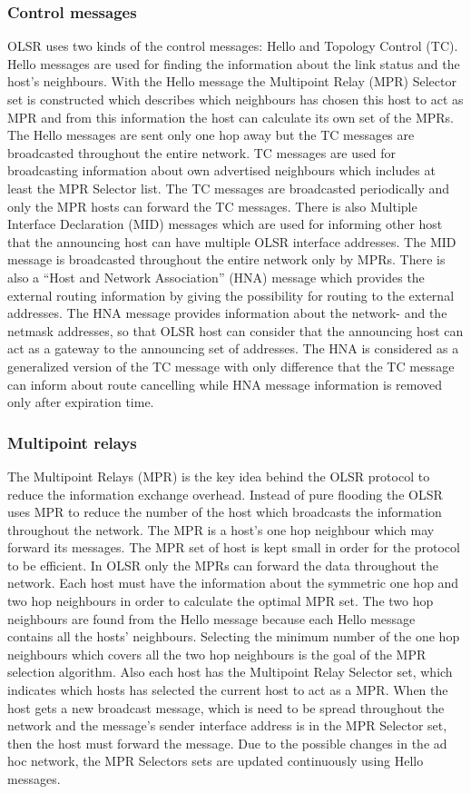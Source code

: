 \documentclass[a4paper]{article}
\begin{document}
\subsubsection{Control messages}
OLSR uses two kinds of the control messages: Hello and Topology Control (TC). Hello messages are used for finding the information about the link status and the host’s neighbours. With the Hello message the Multipoint Relay (MPR) Selector set is constructed which describes which neighbours has chosen this host to act as MPR and from this information the host can calculate its own set of the MPRs. The Hello messages are sent only one hop away but the TC messages are broadcasted throughout the entire network. TC messages are used for broadcasting information about own advertised neighbours which includes at least the MPR Selector list. The TC messages are broadcasted periodically and only the MPR hosts can forward the TC messages.
There is also Multiple Interface Declaration (MID) messages which are used for informing other host that the announcing host can have multiple OLSR interface addresses. The MID message is broadcasted throughout the entire network only by MPRs. There is also a “Host and Network Association” (HNA) message which provides the external routing information by giving the possibility for routing to the external addresses. The HNA message provides information about the network- and the netmask addresses, so that OLSR host can consider that the announcing host can act as a gateway to the announcing set of addresses. The HNA is considered as a generalized version of the TC message with only difference that the TC message can inform about route cancelling while HNA message information is removed only after expiration time.

\subsubsection{Multipoint relays}
The Multipoint Relays (MPR) is the key idea behind the OLSR protocol to reduce the information exchange overhead. Instead of pure flooding the OLSR uses MPR to reduce the number of the host which broadcasts the information throughout the network. The MPR is a host’s one hop neighbour which may forward its messages. The MPR set of host is kept small in order for the protocol to
be efficient. In OLSR only the MPRs can forward the data throughout the network. Each host must have the information about the symmetric one hop and two hop neighbours in order to calculate the
optimal MPR set. The two hop neighbours are found from the Hello message because each Hello message contains all the hosts’ neighbours. Selecting the minimum number of the one hop neighbours which covers all the two hop neighbours is the goal of the MPR selection algorithm.
Also each host has the Multipoint Relay Selector set, which indicates which hosts has selected the current host to act as a MPR. When the host gets a new broadcast message, which is need to be spread throughout the network and the message’s sender interface address is in the MPR Selector set, then the host must forward the message. Due to the possible changes in the ad hoc network, the MPR Selectors sets are updated continuously using Hello messages.
\end{document}
